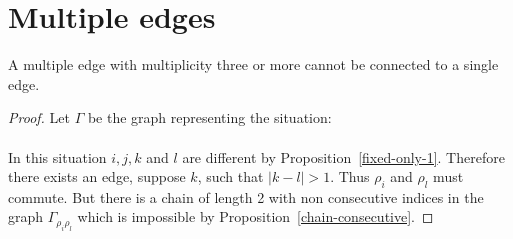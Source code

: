 \section{Multiple edges}

\begin{proposition}
  A multiple edge with multiplicity three or more cannot be connected to a single edge.
\end{proposition}

\begin{proof}
  Let $\Gamma$ be the graph representing the situation:

  \begin{figure}[H]
    \begin{center}
      \caption{}
    \end{center}
  \end{figure}

  \paragraph{}
  In this situation $i,j,k$ and $l$ are different by Proposition~\ref{fixed-only-1}. Therefore there exists an edge, suppose $k$, such that $|k - l| > 1$. Thus $\rho_i$ and $\rho_l$ must commute. But there is a chain of length 2 with non consecutive indices in the graph $\Gamma_{\rho_i \rho_l}$ which is impossible by Proposition~\ref{chain-consecutive}.
\end{proof}

